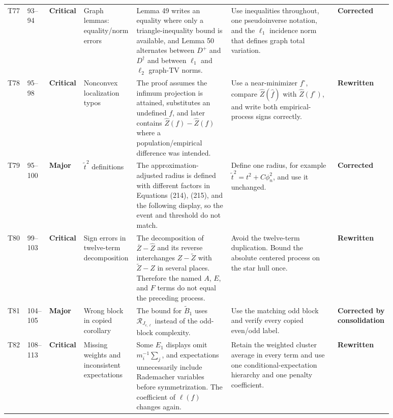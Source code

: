 \documentclass[11pt]{article}
\newcommand{\status}[1]{\textcolor{implgreen}{\textbf{#1}}}
\begin{document}
\begin{landscape}
\begin{longtable}{L{0.04\linewidth}L{0.055\linewidth}L{0.065\linewidth}L{0.11\linewidth}L{0.245\linewidth}L{0.275\linewidth}L{0.095\linewidth}}
T77 & 93--94 & \textcolor{crit}{\textbf{Critical}} & Graph lemmas: equality/norm errors & Lemma 49 writes an equality where only a triangle-inequality bound is available, and Lemma 50 alternates between $D^+$ and $D^\dagger$ and between $\ell_1$ and $\ell_2$ graph-TV norms. & Use inequalities throughout, one pseudoinverse notation, and the $\ell_1$ incidence norm that defines graph total variation. & \status{Corrected}\\
T78 & 95--98 & \textcolor{crit}{\textbf{Critical}} & Nonconvex localization typos & The proof assumes the infimum projection is attained, substitutes an undefined $f$, and later contains $\widehat Z(f)-\widehat Z(f)$ where a population/empirical difference was intended. & Use a near-minimizer $f^\circ$, compare $\widehat Z(\widehat f)$ with $\widehat Z(f^\circ)$, and write both empirical-process signs correctly. & \status{Rewritten}\\
T79 & 95--100 & \textcolor{major}{\textbf{Major}} & $\widetilde t^2$ definitions & The approximation-adjusted radius is defined with different factors in Equations (214), (215), and the following display, so the event and threshold do not match. & Define one radius, for example $\widetilde t^2=t^2+C\phi_n^2$, and use it unchanged. & \status{Corrected}\\
T80 & 99--103 & \textcolor{crit}{\textbf{Critical}} & Sign errors in twelve-term decomposition & The decomposition of $\overline Z-\widehat Z$ and its reverse interchanges $Z-\widetilde Z$ with $\widetilde Z-Z$ in several places. Therefore the named $A$, $E$, and $F$ terms do not equal the preceding process. & Avoid the twelve-term duplication. Bound the absolute centered process on the star hull once. & \status{Rewritten}\\
T81 & 104--105 & \textcolor{major}{\textbf{Major}} & Wrong block in copied corollary & The bound for $\widetilde B_1$ uses $\mathcal R_{J_{e,\ell}}$ instead of the odd-block complexity. & Use the matching odd block and verify every copied even/odd label. & \status{Corrected by consolidation}\\
T82 & 108--113 & \textcolor{crit}{\textbf{Critical}} & Missing weights and inconsistent expectations & Some $E_1$ displays omit $m_i^{-1}\sum_j$, and expectations unnecessarily include Rademacher variables before symmetrization. The coefficient of $\ell(f)$ changes again. & Retain the weighted cluster average in every term and use one conditional-expectation hierarchy and one penalty coefficient. & \status{Rewritten}\\

\end{longtable}
\end{landscape}
\end{document}
